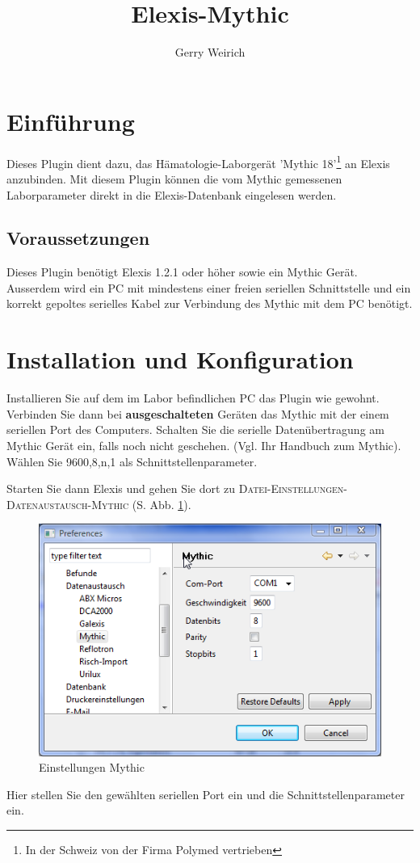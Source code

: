 \documentclass[a4paper]{scrartcl}
\title{Elexis-Mythic}
\author{Gerry Weirich}
\begin{document}
\maketitle
\section{Einführung}
Dieses Plugin dient dazu, das Hämatologie-Laborgerät 'Mythic 18'\footnote{In der Schweiz von der Firma Polymed vertrieben} an Elexis anzubinden. Mit diesem Plugin können die vom Mythic gemessenen Laborparameter direkt in die Elexis-Datenbank eingelesen werden.

\subsection{Voraussetzungen}
Dieses Plugin benötigt Elexis 1.2.1 oder höher sowie ein Mythic Gerät. Ausserdem wird ein PC mit mindestens einer freien seriellen Schnittstelle und ein korrekt gepoltes serielles Kabel zur Verbindung des Mythic mit dem PC benötigt.

\section{Installation und Konfiguration}
Installieren Sie auf dem im Labor befindlichen PC das Plugin wie gewohnt. Verbinden Sie dann bei \textbf{ausgeschalteten} Geräten das Mythic mit der einem seriellen Port des Computers. Schalten Sie die serielle Datenübertragung am Mythic Gerät ein, falls noch nicht geschehen. (Vgl. Ihr Handbuch zum Mythic). Wählen Sie 9600,8,n,1 als Schnittstellenparameter.

Starten Sie dann Elexis und gehen Sie dort zu \textsc{Datei-Einstellungen-Datenaustausch-Mythic} (S. Abb. \ref{fig:mythic1}).
\begin{figure}[h]
    \includegraphics{mythic2}
    \caption{Einstellungen Mythic}
    \label{fig:mythic1}
\end{figure}
Hier stellen Sie den gewählten seriellen Port ein und die Schnittstellenparameter ein.
\end{document}
